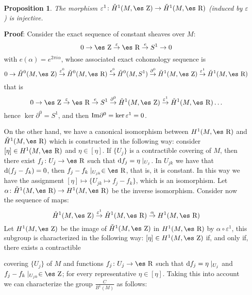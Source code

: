 \documentclass[12pt]{article}
\newtheorem{prop}{Proposition}
\def\dst{\(}
\def\map#1{\mathrel{\mathop{\to}\limits^{#1}}}
\def\qed{\ifvmode\removelastskip\fi
{\unskip\nobreak\hfil\penalty50\hbox{}\nobreak\hfil
\hbox{\vrule height1.2ex width1.2ex}\parfillskip=0pt
\finalhyphendemerits=0 \par\smallskip}}
\def\d{{\rm d}}
\def\Zahl{\mbox{\es Z}}
\def\Real{\mbox{\es R}}
\begin{document}
\begin{prop}
The morphism
$\varepsilon^1 \colon \check H^1(M,\Zahl ) \to \check H^1(M,\Real )$
(induced by $\varepsilon$) is injective.
\end{prop}
{\bf Proof}: 
Consider the exact sequence of constant sheaves over $M$:
$$
0 \to \Zahl \map{\varepsilon} \Real \map{e} S^1 \to 0
$$
with $e(\alpha )= e^{2\pi i \alpha}$,
whose associated exact cohomology sequence is
$$
0 \to \check H^0(M,\Zahl ) \map{\varepsilon^0}
\check H^0(M,\Real ) \map{e^0}
\check H^0(M,S^1) \map{\partial^0}
\check H^1(M,\Zahl ) \map{\varepsilon^1}
\check H^1(M,\Real )
$$
that is
$$
0 \to \Zahl \map{\varepsilon} \Real \map{e} S^1
\map{\partial^0}
\check H^1(M,\Zahl ) \map{\varepsilon^1}
\check H^1(M,\Real ) \ldots
$$
hence $\ker \partial^0 = S^1$, and then
${\rm Im} \partial^0 =\ker \varepsilon^1 = 0$.
\qed

On the other hand,
we have a  canonical isomorphism between
$H^1(M,\Real )$ and $\check H^1(M,\Real )$
which is constructed in the following way:
consider $[\eta ] \in H^1(M,\Real )$
and $\eta \in [\eta ]$.
If $\{ U_j \}$ is a contractible covering of $M$, then there exist
$f_j \colon U_j \to \Real$ such that $\d f_j = \eta\mid_{U_j}$.
In $U_{jk}$ we have that $\d (f_j - f_k) = 0$,
then $f_j-f_k \mid_{U_{jk}} \in \Real$, that is, it is constant.
In this way we have the assignment
$[\eta] \mapsto \{ U_{jk} \mapsto f_j - f_k \}$, which is an
isomorphism.
Let $\alpha \colon \check H^1(M,\Real ) \to H^1(M,\Real )$ be
the inverse isomorphism.
Consider now the sequence of maps:
$$
\check H^1(M,\Zahl ) \map{\varepsilon^1}
\check H^1(M,\Real ) \map{\alpha}
H^1(M,\Real )
$$
Let $H^1(M,\Zahl )$ be the image of
$\check H^1(M,\Zahl )$ in $H^1(M,\Real )$
by $\alpha \circ \varepsilon^1$,
this subgroup is characterized in the following way:
$[\eta ] \in H^1(M,\Zahl )$ if, and only if, there exists a contractible

covering
$\{ U_j \}$ of $M$ and functions $f_j \colon U_j \to \Real$ such that
$\d f_j = \eta \mid_{U_j}$ and $f_j-f_k \mid_{U_{jk}} \in \Zahl$;
for every representative $\eta \in [\eta ]$.
Taking this into account we can characterize the group
\dst\frac{C}{B^1(M)}\) as follows:
\end{document}
